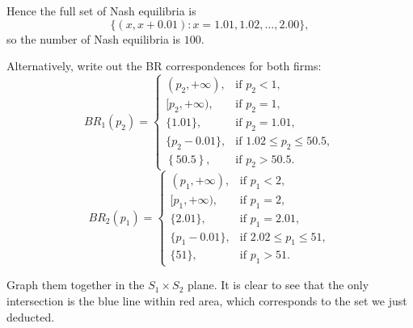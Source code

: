 \documentclass[12pt,a4paper]{article}
\begin{document}
\begin{enumerate}[label=(\alph*)]
  Hence the full set of Nash equilibria is
  \[
      \{(x,x+0.01): x=1.01,1.02,\dots,2.00\},
  \]
  so the number of Nash equilibria is $100$.

  Alternatively, write out the BR correspondences for both firms:
  \[
    BR_1(p_2)=
      \begin{cases}
      (p_2,+\infty), & \text{if } p_2<1,\\
      [p_2,+\infty), & \text{if } p_2=1,\\
      \{1.01\}, & \text{if } p_2=1.01,\\
      \{p_2-0.01\}, & \text{if } 1.02\le p_2\le 50.5,\\
      \left\{50.5\right\}, & \text{if } p_2>50.5.
    \end{cases}
  \]
  \[
    BR_2(p_1)=
      \begin{cases}
      (p_1,+\infty), & \text{if } p_1<2,\\
      [p_1,+\infty), & \text{if } p_1=2,\\
      \{2.01\}, & \text{if } p_1=2.01,\\
      \{p_1-0.01\}, & \text{if } 2.02\le p_1\le 51,\\
      \{51\}, & \text{if } p_1>51.
    \end{cases}
  \]

  Graph them together in the $S_1 \times S_2$ plane. It is clear to see that the only intersection is the blue line within red area, which corresponds to the set we just deducted.
  \begin{center}
\end{center}
\end{enumerate}
\end{document}
